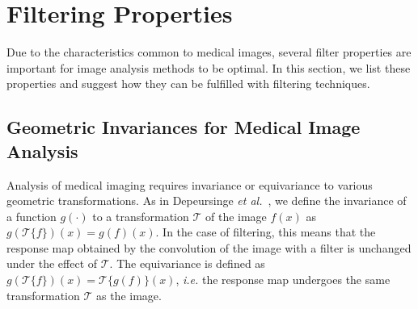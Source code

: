 \documentclass[fleqn,a4paper,oneside,openany]{book}
\begin{document}
\chapter{Filtering Properties}\label{sec:linearFilterProperties}
%
Due to the characteristics common to medical images, several filter properties are important for image analysis methods to be optimal.
In this section, we list these properties and suggest how they can be fulfilled with filtering techniques.
%
\section{Geometric Invariances for Medical Image Analysis}\label{sec:geomInvariances}
%
Analysis of medical imaging requires invariance or equivariance to various geometric transformations.
As in Depeursinge \textit{et al.}~\cite{DFA2017}, we define the invariance of a function $g(\cdot)$ to a transformation $\mathcal{T}$ of the image $f(x)$ as $g(\mathcal{T}\{f\})(x) = g(f)(x)$. In the case of filtering, this means that the response map obtained by the convolution of the image with a filter is unchanged under the effect of $\mathcal{T}$. The equivariance is defined as $g(\mathcal{T}\{f\})(x) = \mathcal{T}\{g(f)\}(x)$, \textit{i.e.} the response map undergoes the same transformation $\mathcal{T}$ as the image. 
%
\end{document}
